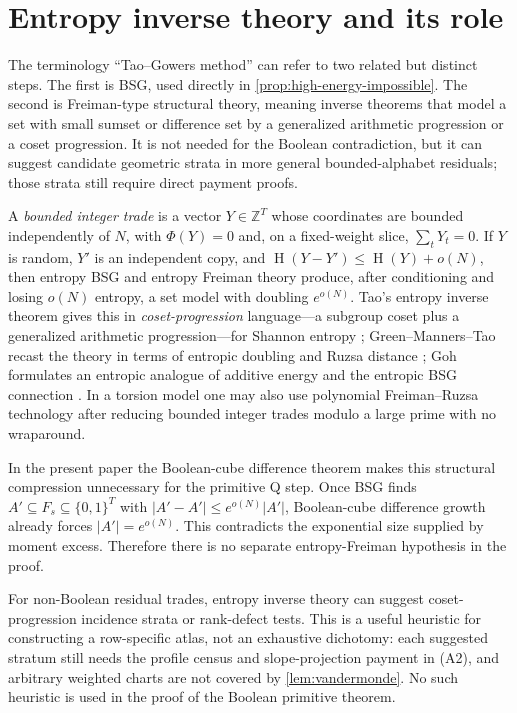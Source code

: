 \documentclass[12pt,a4paper]{amsart}
\numberwithin{equation}{section}
\theoremstyle{remark}
\DeclareMathOperator{\Ent}{H}
\newcommand{\Z}{\mathbb Z}
\newcommand{\abs}[1]{\lvert #1\rvert}
\begin{document}
\section{Entropy inverse theory and its role}\label{sec:entropy-role}

The terminology ``Tao--Gowers method'' can refer to two related but
distinct steps.  The first is BSG, used directly in
\cref{prop:high-energy-impossible}.  The second is Freiman-type structural
theory, meaning inverse theorems that model a set with small sumset or
difference set by a generalized arithmetic progression or a coset
progression.  It is not needed for the Boolean contradiction, but it can suggest
candidate geometric strata in more general bounded-alphabet residuals;
those strata still require direct payment proofs.

A \emph{bounded integer trade} is a vector \(Y\in\Z^T\) whose
coordinates are bounded independently of \(N\), with \(\Phi(Y)=0\) and,
on a fixed-weight slice, \(\sum_tY_t=0\).  If \(Y\) is random, \(Y'\) is
an independent copy, and
\(\Ent(Y-Y')\le \Ent(Y)+o(N)\), then entropy BSG and entropy Freiman
theory produce, after conditioning and losing \(o(N)\) entropy, a set
model with doubling \(e^{o(N)}\).  Tao's entropy inverse theorem gives
this in \emph{coset-progression} language---a subgroup coset plus a
generalized arithmetic progression---for Shannon entropy \cite{TaoEntropy};
Green--Manners--Tao recast the theory in terms of entropic doubling and
Ruzsa distance \cite{GreenMannersTao}; Goh formulates an entropic analogue
of additive energy and the entropic BSG connection \cite{GohEnergy}.  In a
torsion model one may also use polynomial Freiman--Ruzsa technology after
reducing bounded integer trades modulo a large prime with no wraparound.

In the present paper the Boolean-cube difference theorem makes this
structural compression unnecessary for the primitive Q step.  Once BSG
finds \(A'\subseteq F_s\subseteq\{0,1\}^T\) with
\(\abs{A'-A'}\le e^{o(N)}\abs{A'}\), Boolean-cube difference growth
already forces \(\abs{A'}=e^{o(N)}\).  This contradicts the exponential
size supplied by moment excess.  Therefore there is no separate
entropy-Freiman hypothesis in the proof.

For non-Boolean residual trades, entropy inverse theory can suggest
coset-progression incidence strata or rank-defect tests.  This is a useful
heuristic for constructing a row-specific atlas, not an exhaustive
dichotomy: each suggested stratum still needs the profile census and
slope-projection payment in \textup{(A2)}, and arbitrary weighted charts
are not covered by \cref{lem:vandermonde}.  No such heuristic is used in
the proof of the Boolean primitive theorem.
\end{document}

